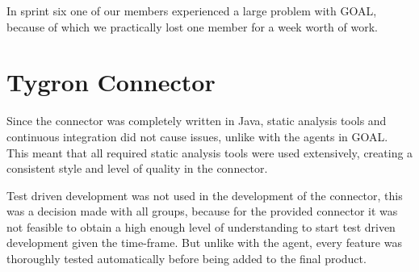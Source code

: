 In sprint six one of our members experienced a large problem with GOAL, because of which we practically lost one member for a week worth of work.

\section{Tygron Connector}
\label{sec:Tygron Connector}

Since the connector was completely written in Java, static analysis tools and continuous integration did not cause issues, unlike with the agents in GOAL. This meant that all required static analysis tools were used extensively, creating a consistent style and level of quality in the connector.

Test driven development was not used in the development of the connector, this was a decision made with all groups, because for the provided connector it was not feasible to obtain a high enough level of understanding to start test driven development given the time-frame. But unlike with the agent, every feature was thoroughly tested automatically before being added to the final product.
